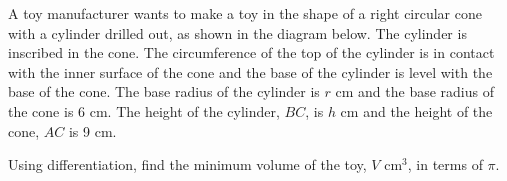 \begin{problem}
    A toy manufacturer wants to make a toy in the shape of a right circular cone with a cylinder drilled out, as shown in the diagram below. The cylinder is inscribed in the cone. The circumference of the top of the cylinder is in contact with the inner surface of the cone and the base of the cylinder is level with the base of the cone. The base radius of the cylinder is $r$ cm and the base radius of the cone is 6 cm. The height of the cylinder, $BC$, is $h$ cm and the height of the cone, $AC$ is 9 cm.

    \begin{center}
    \end{center}

    Using differentiation, find the minimum volume of the toy, $V$ cm$^3$, in terms of $\pi$.
\end{problem}
